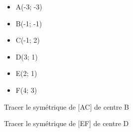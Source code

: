 \documentclass[12pt,a4paper,french,fleqn]{beamer}
\begin{document}
\newcommand{\ax}{-3}
\newcommand{\ay}{-3}
\newcommand{\bx}{-1}
\newcommand{\by}{-1}
\newcommand{\cx}{-1}
\newcommand{\cy}{2}
\newcommand{\dx}{3}
\newcommand{\dy}{1}
\newcommand{\ex}{2}
\newcommand{\ey}{1}
\newcommand{\fx}{4}
\newcommand{\fy}{3}


\begin{frame}
    \begin{minipage}[t]{0.65\textwidth}
        \begin{figure}
            \center
        \end{figure}
    \end{minipage}
    \hfil
    \vrule
    \hfil
    \begin{minipage}[t]{0.32\textwidth}
        
        \begin{itemize}
            \item A(\ax ; \ay)
            \item B(\bx ; \by)
            \item C(\cx ; \cy)
            \item D(\dx ; \dy)
            \item E(\ex ; \ey)
            \item F(\fx ; \fy)
        \end{itemize}
        Tracer le symétrique de [AC] de centre B

        Tracer le symétrique de [EF] de centre D
    \end{minipage}
\end{frame}
\end{document}
